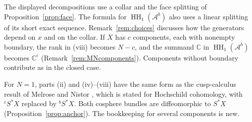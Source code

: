 \documentclass[11pt,oneside,reqno]{article}
\DeclareMathOperator{\HH}{HH}
\newcommand{\C}{\mathbb C}
\newcommand{\Ab}{\mathcal A^b}
\theoremstyle{plain}
\theoremstyle{definition}
\theoremstyle{remark}
\begin{document}
The displayed decompositions use a collar and the face splitting of
Proposition~\ref{prop:face}. The formula for \(\HH_1(\Ab)\) also uses
a linear splitting of its short exact sequence.
Remark~\ref{rem:choices} discusses how the generators depend on \(x\)
and on the collar. If \(X\) has \(c\) components, each with nonempty boundary, the rank
in (viii) becomes \(N-c\), and the summand \(\C\) in \(\HH_1(\Ab)\)
becomes \(\C^{c}\) (Remark~\ref{rem:MNcomponents}). Components without
boundary contribute as in the closed case.

For \(N=1\), parts (ii) and (iv)--(viii) have the same form as the
cusp-calculus result of Melrose and Nistor \cite[(16)]{MN}, which is stated
for Hochschild cohomology, with \({}^cS^*X\) replaced by \({}^bS^*X\). Both
cosphere bundles are diffeomorphic to \(S^*X\)
(Proposition~\ref{prop:anchor}). The bookkeeping for several components is
new.
\end{document}
